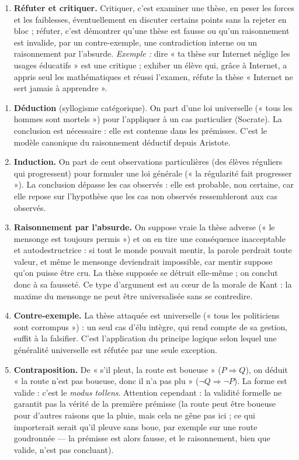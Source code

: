 \documentclass[11pt]{article}
\newcommand{\cle}[1]{{\popxbold\color{popdark}#1}}
\begin{document}
\begin{corrige}
\begin{enumerate}
\item \textbf{\cle{Réfuter} et \cle{critiquer}.} Critiquer, c'est examiner une thèse, en peser les forces et les faiblesses, éventuellement en discuter certains points sans la rejeter en bloc ; réfuter, c'est démontrer qu'une thèse est fausse ou qu'un raisonnement est invalide, par un contre-exemple, une contradiction interne ou un raisonnement par l'absurde. \emph{Exemple :} dire « ta thèse sur Internet néglige les usages éducatifs » est une critique ; exhiber un élève qui, grâce à Internet, a appris seul les mathématiques et réussi l'examen, réfute la thèse « Internet ne sert jamais à apprendre ».
\end{enumerate}
\end{corrige}

\begin{corrige}
\begin{enumerate}
\item \textbf{Déduction} (syllogisme catégorique). On part d'une loi universelle (« tous les hommes sont mortels ») pour l'appliquer à un cas particulier (Socrate). La conclusion est nécessaire : elle est contenue dans les prémisses. C'est le modèle canonique du raisonnement déductif depuis Aristote.
\item \textbf{Induction.} On part de cent observations particulières (des élèves réguliers qui progressent) pour formuler une loi générale (« la régularité fait progresser »). La conclusion dépasse les cas observés : elle est probable, non certaine, car elle repose sur l'hypothèse que les cas non observés ressembleront aux cas observés.
\item \textbf{Raisonnement par l'absurde.} On suppose vraie la thèse adverse (« le mensonge est toujours permis ») et on en tire une conséquence inacceptable et autodestructrice : si tout le monde pouvait mentir, la parole perdrait toute valeur, et même le mensonge deviendrait impossible, car mentir suppose qu'on puisse être cru. La thèse supposée se détruit elle-même ; on conclut donc à sa fausseté. Ce type d'argument est au cœur de la morale de Kant : la maxime du mensonge ne peut être universalisée sans se contredire.
\item \textbf{Contre-exemple.} La thèse attaquée est universelle (« tous les politiciens sont corrompus ») : un seul cas d'élu intègre, qui rend compte de sa gestion, suffit à la falsifier. C'est l'application du principe logique selon lequel une généralité universelle est réfutée par une seule exception.
\item \textbf{Contraposition.} De « s'il pleut, la route est boueuse » ($P \Rightarrow Q$), on déduit « la route n'est pas boueuse, donc il n'a pas plu » ($\neg Q \Rightarrow \neg P$). La forme est valide : c'est le \emph{modus tollens}. Attention cependant : la validité formelle ne garantit pas la vérité de la première prémisse (la route peut être boueuse pour d'autres raisons que la pluie, mais cela ne gêne pas ici ; ce qui importerait serait qu'il pleuve sans boue, par exemple sur une route goudronnée --- la prémisse est alors fausse, et le raisonnement, bien que valide, n'est pas concluant).

\end{enumerate}
\end{corrige}
\end{document}
